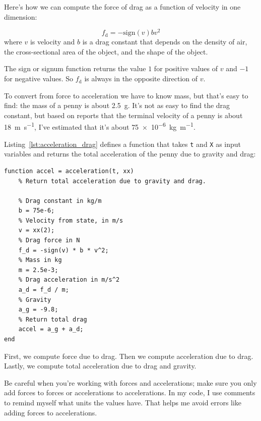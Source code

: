 
Here's how we can compute the force of drag as a function of velocity in one dimension:

\begin{equation*}
    f_\mathrm{d} = -\mathrm{sign}(v) b v^2
\end{equation*}
where $v$ is velocity and
$b$ is a drag constant that depends on the density of
air, the cross-sectional area of the object, and the shape
of the object.

The sign or signum function returns the value $1$ for positive values of
$v$ and $-1$ for negative values.  So $f_\mathrm{d}$ is always in the opposite direction of $v$.


To convert from force to acceleration we have to know mass, but that's easy to find: the mass of a penny is about \SI{2.5}{\gram}.  It's not as easy to find the drag constant, but based on reports that the terminal velocity of a penny is about \SI{18}{\meter \per \second}, I've estimated that it's about \SI{75e-6}{\kilogram \per \meter}.

Listing~\ref{lst:acceleration_drag} defines a function that takes \lstinline{t} and \lstinline{X} as input variables and returns the total acceleration of the penny due to gravity and drag:

\begin{lstlisting}[caption={Calculating acceleration of a penny with drag}, label={lst:acceleration_drag}]
function accel = acceleration(t, xx)
    % Return total acceleration due to gravity and drag.
    
    % Drag constant in kg/m
    b = 75e-6; 
    % Velocity from state, in m/s
    v = xx(2);
    % Drag force in N    
    f_d = -sign(v) * b * v^2;
    % Mass in kg
    m = 2.5e-3;
    % Drag acceleration in m/s^2
    a_d = f_d / m;
    % Gravity
    a_g = -9.8;
    % Return total drag
    accel = a_g + a_d;
end
\end{lstlisting}

First, we compute force due to drag. Then we compute acceleration due to drag. Lastly, we compute total acceleration due to drag and gravity.


Be careful when you're working with forces and accelerations; make sure
you only add forces to forces or accelerations to accelerations.  In my
code, I use comments to remind myself what units the values have.
That helps me avoid errors like adding forces to accelerations.

